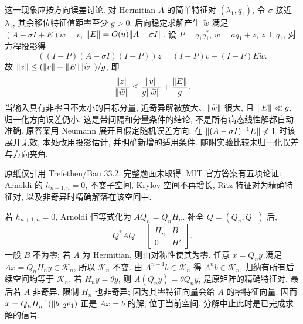 \begin{solution}
这一现象应按方向误差讨论. 对 Hermitian $A$ 的简单特征对 $(\lambda_1,q_1)$, 令 $\sigma$ 接近 $\lambda_1$, 其余移位特征值距零至少 $g>0$. 后向稳定求解产生 $\widetilde w$ 满足 $(A-\sigma I+E)\widetilde w=v$, $\lVert E\rVert=O(u)\lVert A-\sigma I\rVert$. 设 $P=q_1q_1^*$, $\widetilde w=a q_1+z$, $z\perp q_1$, 对方程投影得
\[
 ((I-P)(A-\sigma I)(I-P))z=(I-P)v-(I-P)E\widetilde w.
\]
故 $\lVert z\rVert\le(\lVert v\rVert+\lVert E\rVert\lVert \widetilde w\rVert)/g$, 即
\[
 \frac{\lVert z\rVert}{\lVert \widetilde w\rVert}\le\frac{\lVert v\rVert}{g\lVert \widetilde w\rVert}+\frac{\lVert E\rVert}{g}.
\]
当输入具有非零且不太小的目标分量, 近奇异解被放大、$\lVert \widetilde w\rVert$ 很大, 且 $\lVert E\rVert\ll g$, 归一化方向误差仍小. 这是带间隔和分量条件的结论, 不是所有病态线性解都自动准确. 原答案用 Neumann 展开且假定随机误差方向; 在 $\lVert (A-\sigma I)^{-1}E\rVert\not<1$ 时该展开无效, 本处改用投影估计, 并明确新增的适用条件. 随附实验比较未归一化误差与方向夹角.
\end{solution}
\begin{exercise}\label{ps4:q4}
原纸仅引用 Trefethen/Bau 33.2. 完整题面未取得. MIT 官方答案有五项论证: Arnoldi 的 $h_{n+1,n}=0$, 不变子空间, Krylov 空间不再增长, Ritz 特征对为精确特征对, 以及非奇异时精确解落在该空间中.
\end{exercise}
\begin{solution}
若 $h_{n+1,n}=0$, Arnoldi 恒等式化为 $AQ_n=Q_nH_n$. 补全 $Q=(Q_n,Q_\perp)$ 后,
\[
 Q^*AQ=\begin{bmatrix}H_n&B\\0&H'\end{bmatrix}.
\]
一般 $B$ 不为零; 若 $A$ 为 Hermitian, 则由对称性使其为零. 任意 $x=Q_ny$ 满足 $Ax=Q_nH_ny\in\mathcal K_n$, 所以 $\mathcal K_n$ 不变. 由 $A^{n-1}b\in\mathcal K_n$ 得 $A^nb\in\mathcal K_n$, 归纳有所有后续空间均等于 $\mathcal K_n$. 若 $H_ny=\theta y$, 则 $A(Q_ny)=\theta Q_ny$, 是原矩阵的精确特征对. 最后若 $A$ 非奇异, 限制 $H_n$ 也非奇异; 因为其零特征向量会给 $A$ 的零特征向量. 因而 $x=Q_nH_n^{-1}(\lVert b\rVert_2e_1)$ 正是 $Ax=b$ 的解, 位于当前空间. 分解中止此时是已完成求解的信号.
\end{solution}
